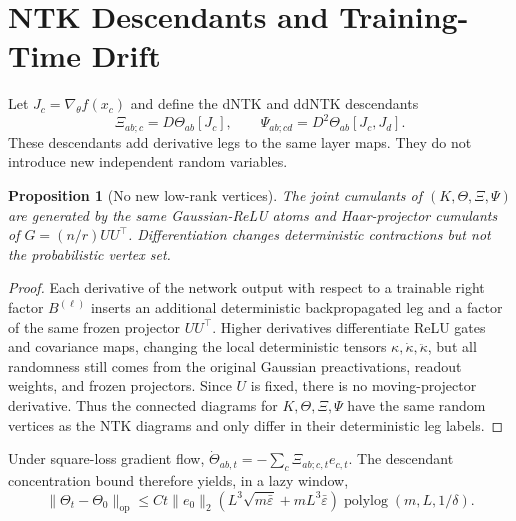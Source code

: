 \documentclass{article}
\newtheorem{proposition}[theorem]{Proposition}
\newcommand{\op}{\mathrm{op}}
\newcommand{\barE}{\bar\varepsilon}
\begin{document}
\section{NTK Descendants and Training-Time Drift}
Let \(J_c=\nabla_\theta f(x_c)\) and define the dNTK and ddNTK descendants
\begin{equation}
\Xi_{ab;c}=D\Theta_{ab}[J_c],
\qquad
\Psi_{ab;cd}=D^2\Theta_{ab}[J_c,J_d].
\end{equation}
These descendants add derivative legs to the same layer maps. They do not introduce new independent random variables.

\begin{proposition}[No new low-rank vertices]
\label{prop:no-new-vertices}
The joint cumulants of \((K,\Theta,\Xi,\Psi)\) are generated by the same Gaussian-ReLU atoms and Haar-projector cumulants of \(G=(n/r)UU^\top\). Differentiation changes deterministic contractions but not the probabilistic vertex set.
\end{proposition}

\begin{proof}
Each derivative of the network output with respect to a trainable right factor \(B^{(\ell)}\) inserts an additional deterministic backpropagated leg and a factor of the same frozen projector \(UU^\top\). Higher derivatives differentiate ReLU gates and covariance maps, changing the local deterministic tensors \(\kappa,\dot\kappa,\ddot\kappa\), but all randomness still comes from the original Gaussian preactivations, readout weights, and frozen projectors. Since \(U\) is fixed, there is no moving-projector derivative. Thus the connected diagrams for \(K,\Theta,\Xi,\Psi\) have the same random vertices as the NTK diagrams and only differ in their deterministic leg labels.
\end{proof}

Under square-loss gradient flow, \(\dot\Theta_{ab,t}=-\sum_c\Xi_{ab;c,t}e_{c,t}\). The descendant concentration bound therefore yields, in a lazy window,
\begin{equation}
\|\Theta_t-\Theta_0\|_{\op}
\le
C t\|e_0\|_2\left(L^3\sqrt{m\barE}+mL^3\barE\right)\operatorname{polylog}(m,L,1/\delta).
\end{equation}
\end{document}
